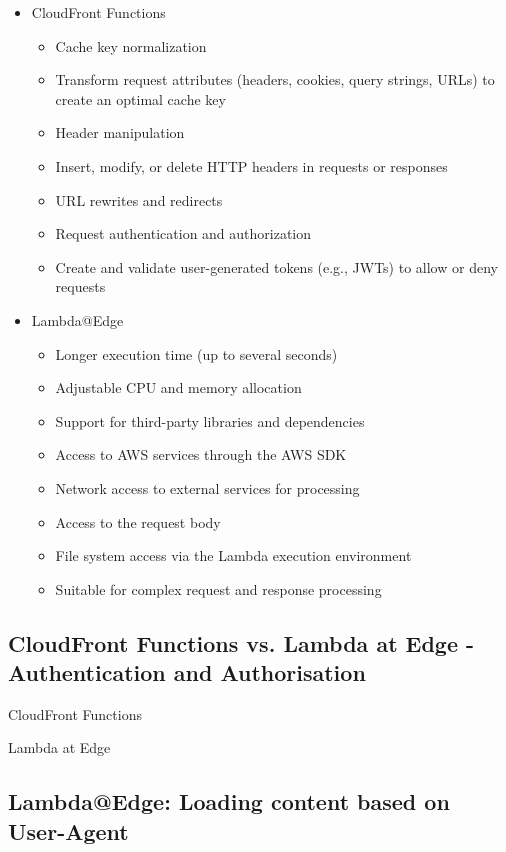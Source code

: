 \begin{itemize}
    \item CloudFront Functions
    \begin{itemize}
        \item Cache key normalization
        \item Transform request attributes (headers, cookies, query strings, URLs) to create an optimal cache key
        \item Header manipulation
        \item Insert, modify, or delete HTTP headers in requests or responses
        \item URL rewrites and redirects
        \item Request authentication and authorization
        \item Create and validate user-generated tokens (e.g., JWTs) to allow or deny requests
    \end{itemize}

    \item Lambda@Edge
    \begin{itemize}
        \item Longer execution time (up to several seconds)
        \item Adjustable CPU and memory allocation
        \item Support for third-party libraries and dependencies
        \item Access to AWS services through the AWS SDK
        \item Network access to external services for processing
        \item Access to the request body
        \item File system access via the Lambda execution environment
        \item Suitable for complex request and response processing
    \end{itemize}
\end{itemize}

\subsection{CloudFront Functions vs. Lambda at Edge - Authentication and Authorisation}
CloudFront Functions

Lambda at Edge

\subsection{Lambda@Edge: Loading content based on User-Agent}


